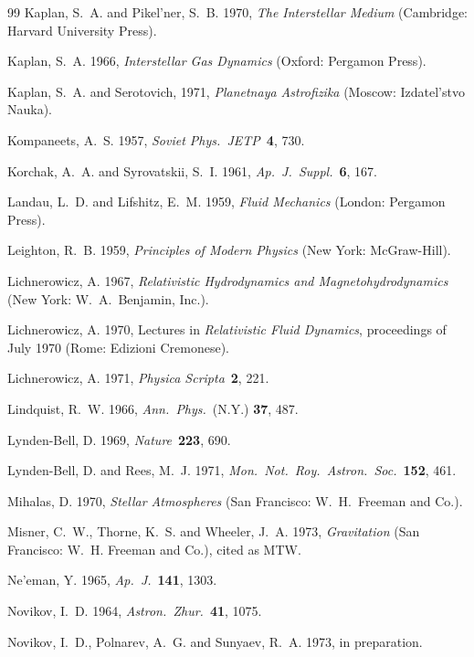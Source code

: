 \begin{thebibliography}{99}
Kaplan, S.~A. and Pikel'ner, S.~B. 1970, \textit{The Interstellar Medium} (Cambridge: Harvard
University Press).

Kaplan, S.~A. 1966, \textit{Interstellar Gas Dynamics} (Oxford: Pergamon Press).

Kaplan, S.~A. and Serotovich, 1971, \textit{Planetnaya Astrofizika} (Moscow: Izdatel'stvo Nauka).

Kompaneets, A.~S. 1957, \textit{Soviet Phys.\ JETP}\ \textbf{4}, 730.

Korchak, A.~A. and Syrovatskii, S.~I. 1961, \textit{Ap.\ J.\ Suppl.}\ \textbf{6}, 167.

Landau, L.~D. and Lifshitz, E.~M. 1959, \textit{Fluid Mechanics} (London: Pergamon Press).

Leighton, R.~B. 1959, \textit{Principles of Modern Physics} (New York: McGraw-Hill).

Lichnerowicz, A. 1967, \textit{Relativistic Hydrodynamics and Magnetohydrodynamics} (New
York: W.~A.~Benjamin, Inc.).

Lichnerowicz, A. 1970, Lectures in \textit{Relativistic Fluid Dynamics}, proceedings of July 1970
(Rome: Edizioni Cremonese).

Lichnerowicz, A. 1971, \textit{Physica Scripta}\ \textbf{2}, 221.

Lindquist, R.~W. 1966, \textit{Ann.\ Phys.}\ (N.Y.) \textbf{37}, 487.

Lynden-Bell, D. 1969, \textit{Nature}\ \textbf{223}, 690.

Lynden-Bell, D. and Rees, M.~J. 1971, \textit{Mon.\ Not.\ Roy.\ Astron.\ Soc.}\ \textbf{152}, 461.

Mihalas, D. 1970, \textit{Stellar Atmospheres} (San Francisco: W.~H.~Freeman and Co.).

Misner, C.~W., Thorne, K.~S. and Wheeler, J.~A. 1973, \textit{Gravitation} (San Francisco: W.~H.
Freeman and Co.), cited as MTW.

Ne'eman, Y. 1965, \textit{Ap.\ J.}\ \textbf{141}, 1303.

Novikov, I.~D. 1964, \textit{Astron.\ Zhur.}\ \textbf{41}, 1075.

Novikov, I.~D., Polnarev, A.~G. and Sunyaev, R.~A. 1973, in preparation.


\end{thebibliography}
